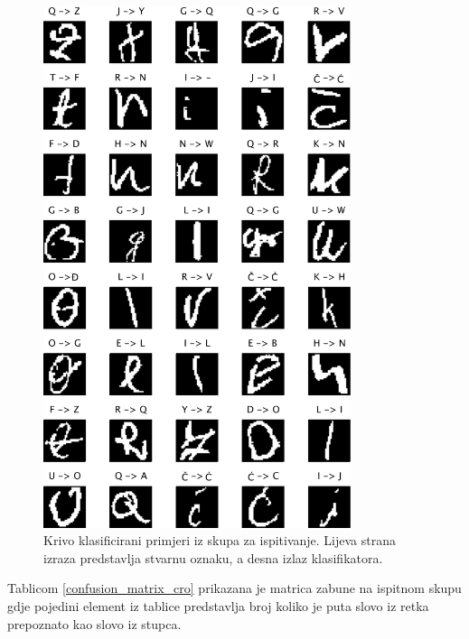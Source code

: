 \begin{figure}[htb]
    \centering
    \includegraphics[width=9cm]{images/wrong_class.pdf}
    \caption{Krivo klasificirani primjeri iz skupa za ispitivanje. Lijeva strana izraza predstavlja stvarnu oznaku, a desna izlaz klasifikatora.}
    \label{fig:wrong_class}
\end{figure}

Tablicom \ref{confusion_matrix_cro} prikazana je matrica zabune na ispitnom skupu gdje pojedini element iz tablice predstavlja broj koliko je puta slovo iz retka prepoznato kao slovo iz stupca.
 
